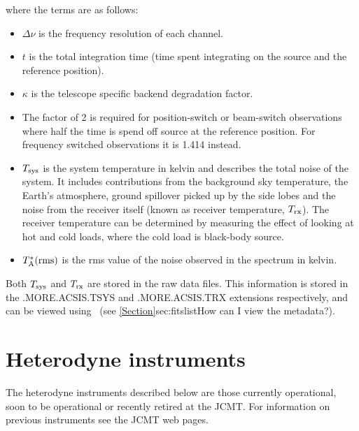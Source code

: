\documentclass[11pt,oneside,chapters]{starlink}
\begin{document}
where the terms are as follows:
\begin{itemize}
\item $\Delta\nu$ is the frequency resolution of each channel.

\item $t$ is the total integration time (time spent integrating on the
source and the reference position).

\item $\kappa$ is the telescope specific backend degradation factor.

\item The factor of 2 is required for position-switch or beam-switch
observations where half the time is spend off source at the reference
position. For frequency switched observations it is 1.414 instead.

\item $T_{\textnormal{sys}}$ is the system temperature in kelvin and
describes the total noise of the system. It includes contributions
from the background sky temperature, the Earth's atmosphere, ground
spillover picked up by the side lobes and the noise from the receiver
itself (known as receiver temperature, $T_{\textnormal{rx}}$).
The receiver temperature can be determined by measuring the effect of
looking at hot and cold loads, where the cold load is black-body
source.

\item $T^*_{\textnormal{A}}({\textnormal{rms}})$ is the rms value of the noise observed
in the spectrum in kelvin.
\end{itemize}


\begin{tip}
Both $T_{\textnormal{sys}}$ and $T_{\textnormal{rx}}$ are stored in
the raw data files. This information is stored in the .MORE.ACSIS.TSYS
and .MORE.ACSIS.TRX extensions respectively, and can be viewed using
\HDSTRACE\ (see \cref{Section}{sec:fitslist}{How can I view the
metadata?}).
\end{tip}


\section{Heterodyne instruments}
\label{sec:instruments}

The heterodyne instruments described below are those currently operational,
soon to be operational or recently retired at the JCMT.
For information on previous instruments see the JCMT web pages.
\end{document}
